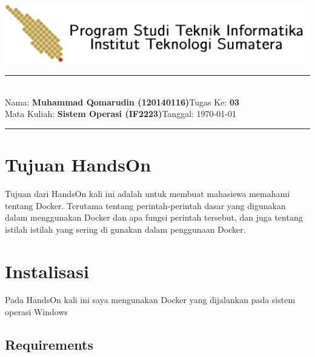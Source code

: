 \documentclass[11pt,a4paper]{article}
\newcommand{\stuid}{120140116}
\newcommand{\student}{\textbf{Muhammad Qomarudin (\stuid{})}}
\newcommand{\course}{\textbf{Sistem Operasi (IF2223)}}
\newcommand{\assignment}{\textbf{03}} %
\begin{document}
\thispagestyle{empty}
\begin{center}
	\includegraphics[scale = 0.15]{Figure/ifitera-header.png}
	\vspace{0.1cm}
\end{center}
\noindent
{\large
\rule{17cm}{0.2cm}\\[0.3cm]
Nama: \student \hfill Tugas Ke: \assignment\\[0.1cm]
Mata Kuliah: \course \hfill Tanggal: \today\\
\rule{17cm}{0.05cm}
\vspace{0.1cm}
}



\section{Tujuan HandsOn}
Tujuan dari HandsOn kali ini adalah untuk membuat mahasiswa memahami tentang Docker. Terutama
tentang perintah-perintah dasar yang digunakan dalam menggunakan Docker dan apa fungsi perintah tersebut, dan juga tentang 
istilah istilah yang sering di gunakan dalam penggunaan Docker.


\section{Instalisasi}
Pada HandsOn kali ini saya mengunakan Docker yang dijalankan pada sistem operasi Windows
\subsection{Requirements}
\end{document}
